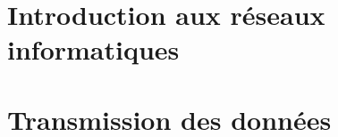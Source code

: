 \documentclass[10pt,a4paper,openany]{book}
\begin{document}
	\setcounter{tocdepth}{2}
	\setcounter{secnumdepth}{3}
	\maketitle
	\tableofcontents
	\part{Introduction aux réseaux informatiques}
		
		
		
		
		
		
%		
%		
	\part{Transmission des données}
		
		
		
		
		
	\appendix
	
	
\end{document}
